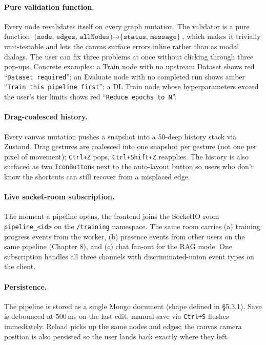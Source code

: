 \documentclass[12pt, a4paper, oneside]{report}
\begin{document}
\paragraph{Pure validation function.} Every node revalidates itself
on every graph mutation. The validator is a pure function
$\texttt{(node, edges, allNodes)} \to \texttt{\{status, message\}}$,
which makes it trivially unit-testable and lets the canvas surface
errors inline rather than as modal dialogs. The user can fix three
problems at once without clicking through three pop-ups. Concrete
examples: a Train node with no upstream Dataset shows red
``\texttt{Dataset required}''; an Evaluate node with no completed
run shows amber ``\texttt{Train this pipeline first}''; a DL Train
node whose hyperparameters exceed the user's tier limits shows red
``\texttt{Reduce epochs to N}''.

\paragraph{Drag-coalesced history.} Every canvas mutation pushes a
snapshot into a 50-deep history stack via Zustand. Drag gestures
are coalesced into one snapshot per gesture (not one per pixel of
movement); \texttt{Ctrl+Z} pops, \texttt{Ctrl+Shift+Z} reapplies.
The history is also surfaced as two \texttt{IconButton}s next to
the auto-layout button so users who don't know the shortcuts can
still recover from a misplaced edge.

\paragraph{Live socket-room subscription.} The moment a pipeline
opens, the frontend joins the SocketIO room
\texttt{pipeline\_<id>} on the \texttt{/training} namespace. The
same room carries (a) training progress events from the worker,
(b) presence events from other users on the same pipeline (Chapter
8), and (c) chat fan-out for the RAG mode. One subscription
handles all three channels with discriminated-union event types on
the client.

\paragraph{Persistence.} The pipeline is stored as a single Mongo
document (shape defined in §5.3.1). Save is debounced at $500$\,ms
on the last edit; manual save via \texttt{Ctrl+S} flushes
immediately. Reload picks up the same nodes and edges; the canvas
camera position is also persisted so the user lands back exactly
where they left.
\end{document}
